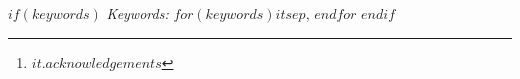 % 

\begin{abstract}
$abstract$
\end{abstract}

$if(keywords)$
\noindent%
{\it Keywords:} $for(keywords)$$it$$sep$, $endfor$
\vfill
$endif$

\author{
$for(by-author)$
$it.name.literal$$if(it.acknowledgements)$\thanks{$it.acknowledgements$}$endif$\\
$for(it.affiliations)$$if(it.department)$$it.department$$if(it.name)$, $endif$$endif$$if(it.name)$$it.name$$endif$$if(it.department)$\\
$elseif(it.name)$\\$endif$
$if(it.email)$\href{mailto:$it.email$}{$it.email$}$endif$
$sep$ \and
$endfor$
}
